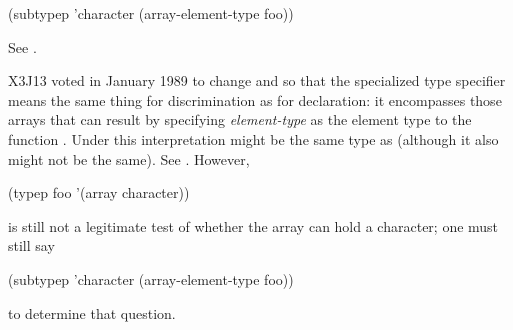 \begin{flushdesc}
\begin{lisp}
(subtypep 'character (array-element-type foo))
\end{lisp}
See .
\begin{new}
X3J13 voted in January 1989
to change  and 
so that the specialized  type specifier
means the same thing for discrimination
as for declaration: it encompasses those arrays
that can result by specifying \emph{element-type} as the element type
to the function .
Under this interpretation  might be
the same type as 
(although it also might not be the same).
See .
However,
\begin{lisp}
(typep foo '(array character))
\end{lisp}
is still not a legitimate test of whether the array
 can hold a character; one must still say
\begin{lisp}
(subtypep 'character (array-element-type foo))
\end{lisp}
to determine that question.


\end{new}
\end{flushdesc}
